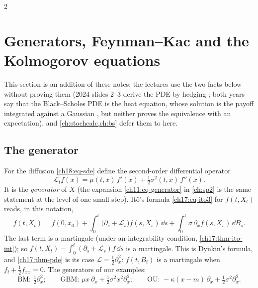 \begin{paracol}{2}
\section{Generators, Feynman--Kac and the Kolmogorov equations}\label{ch18:sec-fk}

This section is an addition of these notes: the lectures use the two facts below without proving them (2024 slides 2--3 derive the PDE by hedging ; both years say that the Black--Scholes PDE is the heat equation, whose solution is the payoff integrated against a Gaussian , but neither proves the equivalence with an expectation), and \cref{ch:stochcalc,ch:bs} defer them to here.

\subsection{The generator}
For the diffusion \eqref{ch18:eq-sde} define the second-order differential operator
\begin{equation}\label{ch18:eq-gen}
  \mathcal L_tf(x)=\mu(t,x)\,f'(x)+\tfrac12\sigma^2(t,x)\,f''(x).
\end{equation}
It is the \emph{generator} of $X$ (the expansion \eqref{ch11:eq-generator} in \cref{ch:sp2} is the same statement at the level of one small step). It\^o's formula \eqref{ch17:eq-ito3} for $f(t,X_t)$ reads, in this notation,
\begin{equation}\label{ch18:eq-dynkin}
  f(t,X_t)=f(0,x_0)+\int_0^t\bigl(\partial_s+\mathcal L_s\bigr)f(s,X_s)\,\dd s+\int_0^t\sigma\,\partial_xf(s,X_s)\,\dd B_s .
\end{equation}
The last term is a martingale (under an integrability condition, \cref{ch17:thm-ito-int}); so $f(t,X_t)-\int_0^t(\partial_s+\mathcal L_s)f\,\dd s$ is a martingale. This is Dynkin's formula, and \cref{ch17:thm-pde} is its case $\mathcal L=\tfrac12\partial_x^2$: $f(t,B_t)$ is a martingale when $f_t+\tfrac12f_{xx}=0$. The generators of our examples:
\[
  \text{BM: }\tfrac12\partial_x^2;\qquad\text{GBM: }\mu x\,\partial_x+\tfrac12\sigma^2x^2\partial_x^2;\qquad\text{OU: }-\kappa(x-m)\,\partial_x+\tfrac12\sigma^2\partial_x^2 .
\]


\end{paracol}
